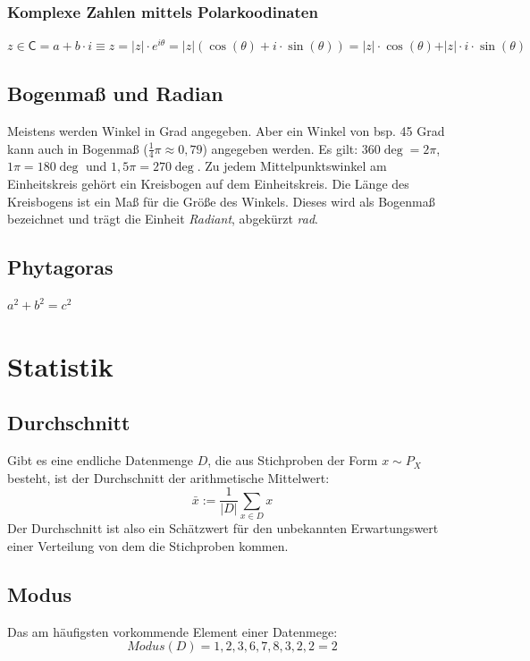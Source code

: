 \documentclass[letterpaper, titlepage]{article}
\begin{document}
\subsubsection{Komplexe Zahlen mittels Polarkoodinaten}
$z \in \mathsf{C} = a + b\cdot i \equiv z = \vert z \vert \cdot e^{i\theta} = \vert z \vert (\cos(\theta) + i \cdot \sin(\theta)) = \vert z \vert \cdot \cos(\theta) + \vert z \vert \cdot i \cdot \sin(\theta)$

\subsection{Bogenmaß und Radian}\label{Bogenmaß und Radian}
Meistens werden Winkel in Grad angegeben. Aber ein Winkel von  bsp. 45 Grad kann auch in Bogenmaß ($\frac{1}{4}\pi \approx 0,79$) angegeben werden. Es gilt: $360\deg = 2\pi$, $1\pi = 180\deg$ und $1,5\pi = 270\deg$. Zu jedem Mittelpunktswinkel am Einheitskreis gehört ein Kreisbogen auf dem Einheitskreis. Die Länge des Kreisbogens ist ein Maß für die Größe des Winkels. Dieses wird als Bogenmaß bezeichnet und trägt die Einheit \textit{Radiant}, abgekürzt \textit{rad}. 
\begin{center}
\end{center}
\subsection{Phytagoras}\label{Phytagoras}
$a^2+b^2=c^2$

\section{Statistik}\label{Statistik}

\subsection{Durchschnitt}\label{Durchschnitt}
Gibt es eine endliche Datenmenge $D$, die aus Stichproben der Form $x\sim P_X$ besteht, ist der Durchschnitt der arithmetische Mittelwert:
$$\bar{x} := \frac{1}{|D|}\sum_{x\in D} x$$
Der Durchschnitt ist also ein Schätzwert für den unbekannten Erwartungswert einer Verteilung von dem die Stichproben kommen.
\subsection{Modus}\label{Modus}
Das am häufigsten vorkommende Element einer Datenmege:
$$ Modus(D) = {1,2,3,6,7,8,3,2,2} = 2$$
\end{document}
